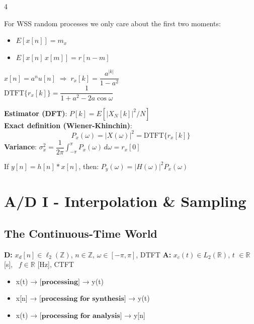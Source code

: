 \documentclass[8pt,a4paper,landscape]{extarticle}
\begin{document}
\begin{multicols*}{4}
\begin{defn}[title=Wide-Sense (WSS) stationarity]
For WSS random processes we only care about the first two moments:
\begin{itemize}
  \item $E[x[n]] = m_x$
  \item $E[x[n]\,x[m]] = r[n-m]$
\end{itemize}
\end{defn}

\begin{warn}[title=Autocorrelation (not given)]
$x[n] = a^n u[n] \;\Rightarrow\; r_x[k] = \dfrac{a^{|k|}}{1 - a^2}$\\
$\mathrm{DTFT}\{r_x[k]\} = \dfrac{1}{1 + a^2 - 2a\cos\omega}$
\end{warn}

\begin{prop}[title=Power Spectral Density (PSD)]
\textbf{Estimator (DFT)}: $P[k] = E\left[|X_N[k]|^2/N\right]$\\
\textbf{Exact definition (Wiener-Khinchin)}:
\[ P_x(\omega) = |X(\omega)|^2 = \mathrm{DTFT}\{r_x[k]\} \]
\textbf{Variance}: $\sigma_x^2 = \dfrac{1}{2\pi}\displaystyle\int_{-\pi}^{\pi} P_x(\omega)\,d\omega = r_x[0]$
\end{prop}

\begin{thm}[title=Convolution theorem (stochastic)]
If $y[n] = h[n] * x[n]$, then: $P_y(\omega) = |H(\omega)|^2 P_x(\omega)$
\end{thm}

\newpage \section{A/D I - Interpolation \& Sampling}

\subsection{The Continuous-Time World}

\begin{defn}[title=CT vs.\ DT paradigm]
\textbf{D:} $x_d[n]\in\ell_2(\mathbb{Z})$, $n\in\mathbb{Z}$, $\omega\in[-\pi,\pi]$, DTFT \newline
\textbf{A:} $x_c(t)\in L_2(\mathbb{R})$, $t$ $\in\mathbb{R}$ [s], \ $f\in\mathbb{R}$ [Hz], CTFT
\end{defn}

\begin{prop}[title=Use cases]
\begin{itemize}
  \item x(t) → $\textbf{[processing]}$ → y(t)
  \item x[n] → $\textbf{[processing for synthesis]}$ → y(t)
  \item x(t) → $\textbf{[processing for analysis]}$ → y[n]
\end{itemize}
\end{prop}


\end{multicols*}
\end{document}
